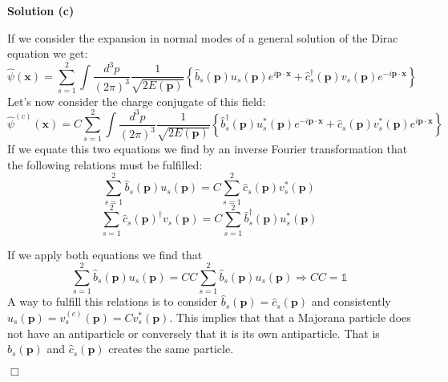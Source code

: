 \documentclass[12pt]{article}
\newcommand{\qedwhite}{\hfill \ensuremath{\Box}}
\begin{document}
\color{blue}

\textbf{Solution (c)}

If we consider the expansion in normal modes of a general solution of the Dirac equation we get:
\[
    \hat{\psi}(\mathbf{x}) = \sum_{s=1}^2\int\frac{d^3p}{(2\pi)^3}\frac{1}{\sqrt{2E(\mathbf{p})}}\left\{\hat{b}_s(\mathbf{p})u_s(\mathbf{p})e^{i\mathbf{p}\cdot \mathbf{x}}+\hat{c}^\dagger_s(\mathbf{p})v_s(\mathbf{p})e^{-i\mathbf{p}\cdot\mathbf{x}}\right\}
\]
Let's now consider the charge conjugate of this field:
\[
    \hat{\psi}^{(c)}(\mathbf{x}) = C\sum_{s=1}^2\int\frac{d^3p}{(2\pi)^3}\frac{1}{\sqrt{2E(\mathbf{p})}}\left\{\hat{b}_s^\dagger (\mathbf{p})u_s^*(\mathbf{p})e^{-i\mathbf{p}\cdot \mathbf{x}}+\hat{c}_s(\mathbf{p})v_s^*(\mathbf{p})e^{i\mathbf{p}\cdot\mathbf{x}}\right\}
\]
If we equate this two equations we find by an inverse Fourier transformation that the following relations must be fulfilled:
\[
    \sum_{s=1}^2 \hat{b}_s(\mathbf{p})u_s(\mathbf{p}) = C\sum_{s=1}^2\hat{c}_s(\mathbf{p})v_s^*(\mathbf{p})
\]
\[
    \sum_{s=1}^2 \hat{c}_s(\mathbf{p})^\dagger v_s(\mathbf{p}) = C\sum_{s=1}^2\hat{b}^\dagger_s(\mathbf{p})u_s^*(\mathbf{p})
\]

If we apply both equations we find that
\[
    \sum_{s=1}^2 \hat{b}_s(\mathbf{p})u_s(\mathbf{p}) = CC\sum_{s=1}^2\hat{b}_s(\mathbf{p})u_s(\mathbf{p}) \Longrightarrow CC = \mathbb{1}
\]
A way to fulfill this relations is to consider $\hat{b}_s(\mathbf{p})=\hat{c}_s(\mathbf{p})$ and consistently $u_s(\mathbf{p})=v_s^{(c)}(\mathbf{p})=Cv_s^*(\mathbf{p})$. This implies that that a Majorana particle does not have an antiparticle or conversely that it is its own antiparticle. That is $\hat{b}_s(\mathbf{p})$ and $\hat{c}_s(\mathbf{p})$ creates the same particle.

\qedwhite
\end{document}

